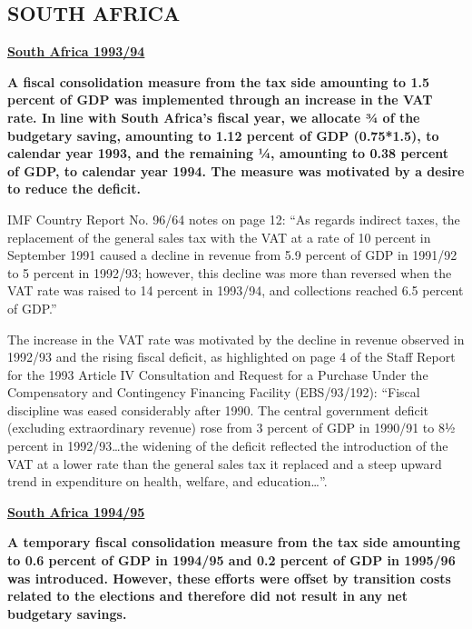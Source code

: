 \subsection[SOUTH AFRICA]{SOUTH AFRICA\protect\footnotemark}

\textbf{\underline{South Africa 1993/94}}

\textbf{A fiscal consolidation measure from the tax side amounting to 1.5 percent of GDP was implemented through an increase in the VAT rate. In line with South Africa’s fiscal year, we allocate ¾ of the budgetary saving, amounting to 1.12 percent of GDP (0.75*1.5), to calendar year 1993, and the remaining ¼, amounting to 0.38 percent of GDP, to calendar year 1994. The measure was motivated by a desire to reduce the deficit.}

IMF Country Report No. 96/64 notes on page 12: “As regards indirect taxes, the replacement of the general sales tax with the VAT at a rate of 10 percent in September 1991 caused a decline in revenue from 5.9 percent of GDP in 1991/92 to 5 percent in 1992/93; however, this decline was more than reversed when the VAT rate was raised to 14 percent in 1993/94, and collections reached 6.5 percent of GDP.”

The increase in the VAT rate was motivated by the decline in revenue observed in 1992/93 and the rising fiscal deficit, as highlighted on page 4 of the Staff Report for the 1993 Article IV Consultation and Request for a Purchase Under the Compensatory and Contingency Financing Facility (EBS/93/192): “Fiscal discipline was eased considerably after 1990. The central government deficit (excluding extraordinary revenue) rose from 3 percent of GDP in 1990/91 to 8½ percent in 1992/93…the widening of the deficit reflected the introduction of the VAT at a lower rate than the general sales tax it replaced and a steep upward trend in expenditure on health, welfare, and education…”.

\textbf{\underline{South Africa 1994/95}}

\textbf{A temporary fiscal consolidation measure from the tax side amounting to 0.6 percent of GDP in 1994/95 and 0.2 percent of GDP in 1995/96 was introduced. However, these efforts were offset by transition costs related to the elections and therefore did not result in any net budgetary savings.}

